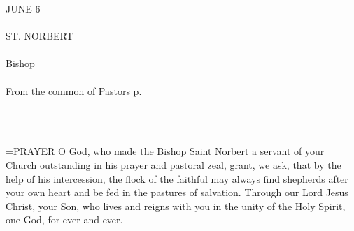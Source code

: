 \begin{center}\normalsize \begin{center}\normalsize JUNE 6\\\\
\footnotesize \footnotesize ST. NORBERT\\\\
\footnotesize \footnotesize Bishop\\\\
\footnotesize \footnotesize From the common of Pastors p. \\\\
\footnotesize \end{center}\\
\end{center}

\hangindent=\parindent \small{PRAYER 
O God, who made the Bishop Saint Norbert
a servant of your Church
outstanding in his prayer and pastoral zeal,
grant, we ask, that by the help of his intercession,
the flock of the faithful
may always find shepherds after your own heart
and be fed in the pastures of salvation.
Through our Lord Jesus Christ, your Son,
who lives and reigns with you in the unity of the Holy Spirit,
one God, for ever and ever.\\}
 
